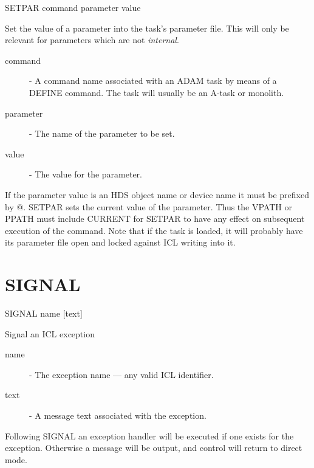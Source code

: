    SETPAR \hspace{.5cm} command \hspace{.5cm} parameter \hspace{.5cm} value

Set the value of a parameter into the task's parameter file.
This will only be relevant for parameters which are not {\em internal}.

\begin{description}

\item[command] - A command name associated with an ADAM task by means
                 of a DEFINE command. The task will usually be an A-task
                 or monolith.

\item[parameter] - The name of the parameter to be set.

\item[value] - The value for the parameter.

\end{description}

If the parameter value is an HDS object name or device name it must be 
prefixed by @. SETPAR sets the current value of the parameter. Thus the
VPATH or PPATH must include CURRENT for SETPAR to have any effect on
subsequent execution of the command.
Note that if the task is loaded, it will probably have its parameter file open
and locked against ICL writing into it.

\section{SIGNAL}

   SIGNAL \hspace{.5cm} name  \hspace{.5cm} [text]

 Signal an ICL exception

\begin{description}

 \item[name] - The exception name --- any valid ICL identifier.

 \item[text] - A message text associated with the exception.

\end{description}

Following SIGNAL an exception handler will be executed if one exists
for the exception. Otherwise a message will be output, and control will
return to direct mode.


